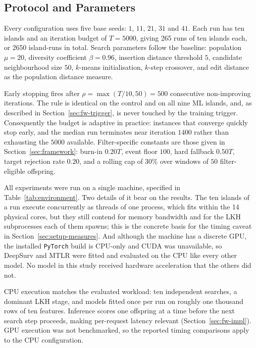 \documentclass[a4paper,fleqn]{cas-dc}
\begin{document}
\subsection{Protocol and Parameters}\label{sec:setup-protocol}

Every configuration uses five base seeds: $1$, $11$, $21$, $31$ and $41$.
Each run has ten islands
and an iteration budget of $T = 5000$, giving 265 runs of ten islands each, or
2650 island-runs in total. Search parameters follow the baseline: population
$\mu = 20$, diversity coefficient $\beta = 0.96$, insertion distance threshold
$5$, candidate neighbourhood size $50$, $k$-means initialisation, $k$-step
crossover, and edit distance as the population distance measure.

Early stopping fires after $\rho = \max(T/10, 50) = 500$ consecutive
non-improving iterations. The rule is identical on the control and on all nine
ML islands, and, as described in Section~\ref{sec:fw-trigger}, is never
touched by the training trigger. Consequently the budget is adaptive in
practice: instances that converge quickly stop early, and the median run
terminates near iteration $1400$ rather than exhausting the $5000$ available.
Filter-specific constants are those given in Section~\ref{sec:framework}: burn-in
$0.20T$, event floor $100$, hard fallback $0.50T$, target rejection rate $0.20$,
and a rolling cap of $30\%$ over windows of $50$ filter-eligible offspring.

All experiments were run on a single machine, specified in
Table~\ref{tab:environment}. Two details of it bear on the results. The ten
islands of a run execute concurrently as threads of one process, which fits
within the 14 physical cores, but they still contend for memory bandwidth and
for the LKH subprocesses each of them spawns; this is the concrete basis for
the timing caveat in Section~\ref{sec:setup-measures}. And although the machine
has a discrete GPU, the installed \texttt{PyTorch} build is CPU-only and CUDA was
unavailable, so DeepSurv and MTLR were fitted and evaluated on the CPU like every
other model. No model in this study received hardware acceleration that the
others did not.

CPU execution matches the evaluated workload: ten independent searches, a
dominant LKH stage, and models fitted once per run on roughly one thousand rows
of ten features. Inference scores one offspring at a time before the next search
step proceeds, making per-request latency relevant
(Section~\ref{sec:fw-impl}). GPU execution was not benchmarked, so the reported
timing comparisons apply to the CPU configuration.
\end{document}
